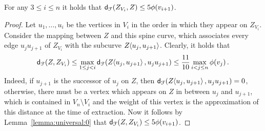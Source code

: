 \documentclass[12pt]{article}
\newcommand{\lemlab}[1]{\label{lemma:#1}}
\newcommand{\lemref}[1]{Lemma~\ref{lemma:#1}}
\newcommand{\ts}{\hspace{0.6pt}}
\newcommand{\distFr}[2]{\mathsf{d}_{\EuScript{F}}\pth{#1, #2}}
\newcommand{\cZ}{{Z}}
\providecommand{\pth}[2][\!]{#1\left({#2}\right)}
\newcommand{\SC}[3]{{#1}\!\!\ts\ts \left\langle  #2, #3 \right\rangle}
\newcommand{\SpCrv}[2]{{#1}_{#2}}
\newcommand{\VtxSet}{{V}}
\newcommand{\vtxA}{u}
\newcommand{\vtxB}{v}
\newcommand{\const}{\ensuremath{\frac{11}{10}}}
\newcommand{\weight}[1]{\ensuremath{\phi\pth{\vtx_{#1}}}}
\newcommand{\vtx}{\vtxB}
\newcommand{\segX}[2]{{#1}{#2}}
\numberwithin{figure}{section}
\numberwithin{equation}{section}
\newcommand{\postdecessor}{successor\xspace}
\begin{document}
\begin{lemma}\lemlab{universal:i}For any $3 \leq i \leq n$ it holds that $\distFr{\SpCrv{\cZ}{\VtxSet_i}}{\cZ} \leq 5 \weight{i+1}$.
\end{lemma}
\begin{proof}
    Let $\vtxA_1,\dots,\vtxA_{i}$ be the vertices in $\VtxSet_i$ in
    the order in which they appear on $\SpCrv{\cZ}{\VtxSet_i}$.
    Consider the mapping between $\cZ$ and this spine curve, which
    associates every edge $\segX{\vtxA_j}{\vtxA_{j+1}}$ of
    $\SpCrv{\cZ}{\VtxSet_i}$ with the subcurve
    $\SC{\cZ}{\vtxA_j}{\vtxA_{j+1}}$. Clearly, it holds that
    \begin{align*}
        \distFr{\cZ}{\SpCrv{\cZ}{\VtxSet_i}} \leq \max_{1 \leq j < i} \distFr{\SC{\cZ}{\vtxA_j}{\vtxA_{j+1}}}
        {\segX{\vtxA_j}{\vtxA_{j+1}}} \leq \const \max_{i < j \leq n} \weight{j}.
    \end{align*}
    Indeed, if $\vtxA_{j+1}$ is the \postdecessor of $\vtxA_j$ on
    $\cZ$, then
    $\distFr{\SC{\cZ}{\vtxA_j}{\vtxA_{j+1}}}{\segX{\vtxA_j}{
          \vtxA_{j+1}}} = 0$, otherwise, there must be a vertex which
    appears on $\cZ$ in between $\vtxA_j$ and $\vtxA_{j+1}$, which is
    contained in $\VtxSet_n \setminus \VtxSet_i$ and the weight of
    this vertex is the approximation of this distance at the time of
    extraction.  Now it follows by \lemref{universal:0} that
    $\distFr{\cZ}{\SpCrv{\cZ}{\VtxSet_i}}\leq 5 \weight{i+1}$.
\end{proof}
\end{document}
